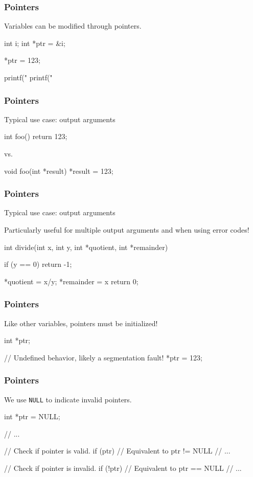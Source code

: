 \documentclass[12pt,t]{beamer}
\begin{document}
  \begin{frame}[fragile]
    \frametitle{Pointers}

    Variables can be modified through pointers.
    \begin{code}
int i;
int *ptr = &i;

*ptr = 123;

printf("%
printf("%
    \end{code}
  \end{frame}

    \begin{frame}[fragile]
    \frametitle{Pointers}

    Typical use case: output arguments

    \begin{code}
int foo()
{
  return 123;
}
    \end{code}
    vs.
    \begin{code}
void foo(int *result)
{
  *result = 123;
}
    \end{code}
  \end{frame}

  \begin{frame}[fragile]
    \frametitle{Pointers}

    Typical use case: output arguments

    Particularly useful for multiple output arguments and when using error codes!
    \begin{code}
int divide(int x, int y,
           int *quotient, int *remainder)
{
  if (y == 0) return -1;

  *quotient = x/y;
  *remainder = x%
  return 0;
}
    \end{code}
  \end{frame}

  \begin{frame}[fragile]
    \frametitle{Pointers}

    Like other variables, pointers must be initialized!
    \begin{code}
int *ptr;

// Undefined behavior, likely a segmentation fault!
*ptr = 123;
    \end{code}
  \end{frame}

  \begin{frame}[fragile]
    \frametitle{Pointers}

    We use \texttt{NULL} to indicate invalid pointers.
    \begin{code}
int *ptr = NULL;

// ...

// Check if pointer is valid.
if (ptr) { // Equivalent to ptr != NULL
  // ...
}

// Check if pointer is invalid.
if (!ptr) { // Equivalent to ptr == NULL
  // ...
}
    \end{code}
  \end{frame}
\end{document}
